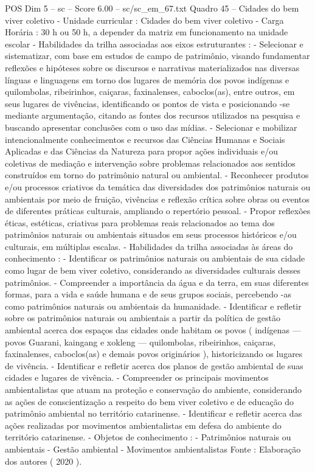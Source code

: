 \begin{textsample}{POS Dim 5 – sc – Score 6.00 – sc/sc\_em\_67.txt}
Quadro 45 – Cidades do bem viver coletivo - Unidade curricular : Cidades do bem viver coletivo - Carga Horária : 30 h ou 50 h, a depender da matriz em funcionamento na unidade escolar - Habilidades da trilha associadas aos eixos estruturantes : - Selecionar e sistematizar, com base em estudos de campo de patrimônio, visando fundamentar reflexões e hipóteses sobre os discursos e narrativas materializados nas diversas línguas e linguagens em torno dos lugares de memória dos povos indígenas e quilombolas, ribeirinhos, caiçaras, faxinalenses, caboclos(as), entre outros, em seus lugares de vivências, identificando os pontos de vista e posicionando -se mediante argumentação, citando as fontes dos recursos utilizados na pesquisa e buscando apresentar conclusões com o uso das mídias. - Selecionar e mobilizar intencionalmente conhecimentos e recursos das Ciências Humanas e Sociais Aplicadas e das Ciências da Natureza para propor ações individuais e/ou coletivas de mediação e intervenção sobre problemas relacionados aos sentidos construídos em torno do patrimônio natural ou ambiental. - Reconhecer produtos e/ou processos criativos da temática das diversidades dos patrimônios naturais ou ambientais por meio de fruição, vivências e reflexão crítica sobre obras ou eventos de diferentes práticas culturais, ampliando o repertório pessoal. - Propor reflexões éticas, estéticas, criativas para problemas reais relacionados ao tema dos patrimônios naturais ou ambientais situados em seus processos históricos e/ou culturais, em múltiplas escalas. - Habilidades da trilha associadas às áreas do conhecimento : - Identificar os patrimônios naturais ou ambientais de sua cidade como lugar de bem viver coletivo, considerando as diversidades culturais desses patrimônios. - Compreender a importância da água e da terra, em suas diferentes formas, para a vida e saúde humana e de seus grupos sociais, percebendo -as como patrimônios naturais ou ambientais da humanidade. - Identificar e refletir sobre os patrimônios naturais ou ambientais a partir da política de gestão ambiental acerca dos espaços das cidades onde habitam os povos ( indígenas — povos Guarani, kaingang e xokleng — quilombolas, ribeirinhos, caiçaras, faxinalenses, caboclos(as) e demais povos originários ), historicizando os lugares de vivência. - Identificar e refletir acerca dos planos de gestão ambiental de suas cidades e lugares de vivência. - Compreender os principais movimentos ambientalistas que atuam na proteção e conservação do ambiente, considerando as ações de conscientização a respeito do bem viver coletivo e de educação do patrimônio ambiental no território catarinense. - Identificar e refletir acerca das ações realizadas por movimentos ambientalistas em defesa do ambiente do território catarinense. - Objetos de conhecimento : - Patrimônios naturais ou ambientais - Gestão ambiental - Movimentos ambientalistas Fonte : Elaboração dos autores ( 2020 ).

\end{textsample}
